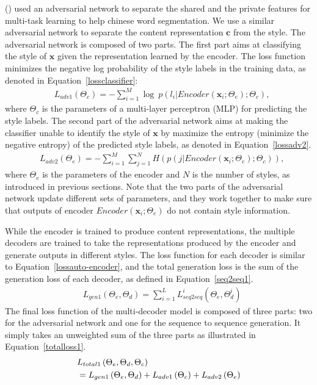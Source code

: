 \documentclass[letterpaper]{article} \usepackage{aaai18}  \usepackage{times}  \usepackage{helvet}  \usepackage{courier}  \usepackage{url}  \usepackage{graphicx}  \usepackage{amsmath}
\newcommand{\newcite}[1]{\citeauthor{#1} (\citeyear{#1})}
\newcommand{\vect}[1]{\mathbf{#1}}
\newcommand{\vc}[0]{\vect{c}}
\newcommand{\vx}[0]{\vect{x}}
\begin{document}
\newcite{chen2017adversarial} used an adversarial network to separate the shared and the private features for multi-task learning to help chinese word segmentation. 
We use a similar adversarial network to separate the content representation $\vc$ from the style.
The adversarial network is composed of two parts.
The first part aims at classifying the style of $\vx$ given the representation learned by the encoder.
The loss function minimizes the negative log probability of the style labels in the training data, as denoted in Equation~\ref{lossclassifier}: 
{\small
\begin{align}
&L_{adv1}\left(\Theta_c \right)= - \sum_{i=1}^{M}\log~p \left( l_i|Encoder(\vx_i; \Theta_e);\Theta_c \right),    \label{lossclassifier} 
\end{align}
} where $\Theta_c$ is the parameters of a multi-layer perceptron (MLP) for predicting the style labels. 
The second part of the adversarial network aims at making the classifier unable to identify the style of $\vx$ by 
maximize the entropy (minimize the negative entropy) of the predicted style labels, as denoted in Equation~\ref{lossadv2}. 
{\small
\begin{align}
&L_{adv2}\left( \Theta_e \right)=-\sum_{i=1}^{M}\sum_{j=1}^{N} H\left( p \left( j|Encoder(\vx_i; \Theta_e);\Theta_c \right) \right), \label{lossadv2}  
\end{align}
} where $\Theta_e$ is the parameters of the encoder and $N$ is the number of styles, as introduced in previous sections. 
Note that the two parts of the adversarial network update different sets of parameters, and
they work together to make sure that outputs of encoder $Encoder(\vx_i; \Theta_e)$ do not contain style information. 

While the encoder is trained to produce content representations, the multiple decoders are trained to 
take the representations produced by the encoder and generate outputs in different styles. 
The loss function for each decoder is similar to  Equation~\ref{lossauto-encoder}, and the total generation 
loss is the sum of the generation loss of each decoder, as defined in Equation~\ref{seq2seq1}.
{\small
\begin{align}
&L_{gen1} \left( \Theta_e,\Theta_d \right) = \sum_{i=1}^{L} L_{seq2seq}^i \left( \Theta_e,\Theta_d^i \right) \label{seq2seq1}
\end{align}
}The final loss function of the multi-decoder model is composed of three parts: 
two for the adversarial network and one for the sequence to sequence generation.   
It simply takes an unweighted sum of the three parts as illustrated in Equation~\ref{totalloss1}.
{\small
\begin{align}
&L_{total1}\left( \Theta_e,\Theta_d,\Theta_c \right)  \notag \\
&= L_{gen1}\left( \Theta_e,\Theta_d \right) + L_{adv1}\left( \Theta_c \right) + L_{adv2}\left( \Theta_e \right)  \label{totalloss1}
\end{align}
}
\end{document}
